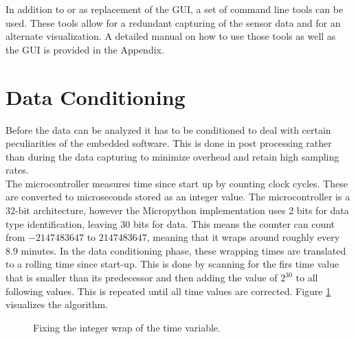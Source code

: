 In addition to or as replacement of the GUI, a set of command line tools can be used. These tools allow for a redundant capturing of the sensor data and for an alternate visualization. A detailed manual on how to use those tools as well as the GUI is provided in the Appendix.

\section{Data Conditioning}

Before the data can be analyzed it has to be conditioned to deal with certain peculiarities of the embedded software. This is done in post processing rather than during the data capturing to minimize overhead and retain high sampling rates.\\

The microcontroller measures time since start up by counting clock cycles. These are converted to microseconds stored as an integer value. The microcontroller is a 32-bit architecture, however the Micropython implementation uses 2 bits for data type identification, leaving 30 bits for data. This means the counter can count from $-2147483647$ to $2147483647$, meaning that it wraps around roughly every $8.9$ minutes. In the data conditioning phase, these wrapping times are translated to a rolling time since start-up. This is done by scanning for the firs time value that is smaller than its predecessor and then adding the value of $2^{30}$ to all following values. This is repeated until all time values are corrected. Figure \ref{fig:wrap} visualizes the algorithm.\\

\begin{figure}
	\begin{center}
		\caption{Fixing the integer wrap of the time variable.}
		\label{fig:wrap}
	\end{center}
\end{figure}

